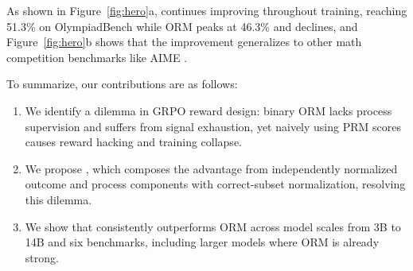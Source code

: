 As shown in Figure~\ref{fig:hero}a, \method{} continues improving throughout training, reaching 51.3\% on OlympiadBench \citep{he2024olympiadbench} while ORM peaks at 46.3\% and declines, and Figure~\ref{fig:hero}b shows that the improvement generalizes to other math competition benchmarks like AIME \citep{balunovic_srimatharena_2025}.

To summarize, our contributions are as follows:
\begin{enumerate}
    \item We identify a dilemma in GRPO reward design: binary ORM lacks process supervision and suffers from signal exhaustion, yet naively using PRM scores causes reward hacking and training collapse.
    \item We propose \method{}, which composes the advantage from independently normalized outcome and process components with correct-subset normalization, resolving this dilemma.
    \item We show that \method{} consistently outperforms ORM across model scales from 3B to 14B and six benchmarks, including larger models where ORM is already strong.
\end{enumerate}
